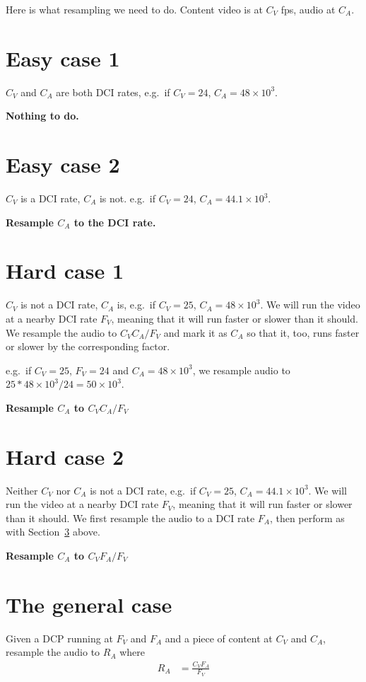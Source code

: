 \documentclass{article}
\begin{document}
Here is what resampling we need to do.  Content video is at $C_V$ fps, audio at $C_A$.  

\section{Easy case 1}

$C_V$ and $C_A$ are both DCI rates, e.g.\ if $C_V = 24$, $C_A = 48\times{}10^3$.

\medskip
\textbf{Nothing to do.}

\section{Easy case 2}

$C_V$ is a DCI rate, $C_A$ is not.  e.g.\ if $C_V = 24$, $C_A = 44.1\times{}10^3$.

\medskip
\textbf{Resample $C_A$ to the DCI rate.}

\section{Hard case 1}
\label{sec:hard1}

$C_V$ is not a DCI rate, $C_A$ is, e.g.\ if $C_V = 25$, $C_A =
48\times{}10^3$.  We will run the video at a nearby DCI rate $F_V$,
meaning that it will run faster or slower than it should.  We resample
the audio to $C_V C_A / F_V$ and mark it as $C_A$ so that it, too,
runs faster or slower by the corresponding factor.

e.g.\ if $C_V = 25$, $F_V = 24$ and $C_A = 48\times{}10^3$, we
resample audio to $25 * 48\times{}10^3 / 24 = 50\times{}10^3$.

\medskip
\textbf{Resample $C_A$ to $C_V C_A / F_V$}

\section{Hard case 2}

Neither $C_V$ nor $C_A$ is not a DCI rate, e.g.\ if $C_V = 25$, $C_A =
44.1\times{}10^3$.  We will run the video at a nearby DCI rate $F_V$,
meaning that it will run faster or slower than it should.  We first
resample the audio to a DCI rate $F_A$, then perform as with
Section~\ref{sec:hard1} above.

\medskip
\textbf{Resample $C_A$ to $C_V F_A / F_V$}


\section{The general case}

Given a DCP running at $F_V$ and $F_A$ and a piece of content at $C_V$
and $C_A$, resample the audio to $R_A$ where
\begin{align*}
R_A &= \frac{C_V F_A}{F_V}
\end{align*}
\end{document}
